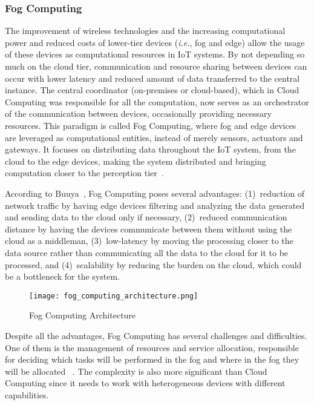 \subsubsection{Fog Computing}\label{sec:fog_computing}

The improvement of wireless technologies and the increasing computational power and reduced costs of lower-tier devices (\emph{i.e.}, fog and edge) allow the usage of these devices as computational resources in IoT systems. By not depending so much on the cloud tier, communication and resource sharing between devices can occur with lower latency and reduced amount of data transferred to the central instance. The central coordinator (on-premises or cloud-based), which in Cloud Computing was responsible for all the computation, now serves as an orchestrator of the communication between devices, occasionally providing necessary resources. This paradigm is called Fog Computing, where fog and edge devices are leveraged as computational entities, instead of merely sensors, actuators and gateways. It focuses on distributing data throughout the IoT system, from the cloud to the edge devices, making the system distributed and bringing computation closer to the perception tier~\cite{mobile_cloud}.

According to Buuya~\cite{IoT_principles_and_paradigms}, Fog Computing poses several advantages: (1)~reduction of network traffic by having edge devices filtering and analyzing the data generated and sending data to the cloud only if necessary, (2)~reduced communication distance by having the devices communicate between them without using the cloud as a middleman, (3)~low-latency by moving the processing closer to the data source rather than communicating all the data to the cloud for it to be processed, and (4)~scalability by reducing the burden on the cloud, which could be a bottleneck for the system.

\begin{figure}[h]
\centering
\texttt{[image: fog\_computing\_architecture.png]}
\caption[Fog Computing Architecture]{Fog Computing Architecture~\cite{IoT_principles_and_paradigms}}
\label{fig:fog_architecture}
\end{figure}

Despite all the advantages, Fog Computing has several challenges and difficulties. One of them is the management of resources and service allocation, responsible for deciding which tasks will be performed in the fog and where in the fog they will be allocated ~\cite{mukherjee}. The complexity is also more significant than Cloud Computing since it needs to work with heterogeneous devices with different capabilities.
       

